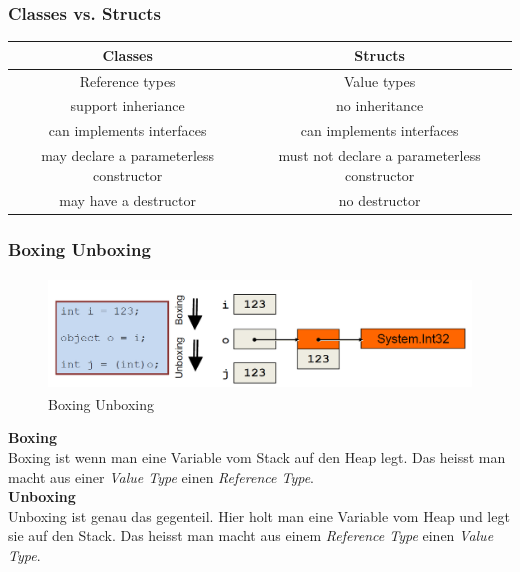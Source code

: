 \subsubsection{Classes vs. Structs}
\begin{tabular}{|c|c|}
	\hline
	           \textbf{Classes }            &               \textbf{Structs}               \\ \hline
	            Reference types             &                 Value types                  \\ \hline
	          support inheriance            &                no inheritance                \\ \hline
	       can implements interfaces        &          can implements interfaces           \\ \hline
	may declare a parameterless constructor & must not declare a parameterless constructor \\ \hline
	         may have a destructor          &                no destructor                 \\ \hline
\end{tabular} 

\subsubsection{Boxing Unboxing}
\begin{figure}[h]
	\centering
	\includegraphics[height=3cm, ]{images/CSharp/BoxingUnboxing}
	\caption{Boxing Unboxing}	
\end{figure}

\textbf{Boxing}\\
Boxing ist wenn man eine Variable vom Stack auf den Heap legt. Das heisst man macht aus einer \textit{Value Type} einen \textit{Reference Type}.\\ 

\textbf{Unboxing}\\
Unboxing ist genau das gegenteil. Hier holt man eine Variable vom Heap und legt sie auf den Stack. Das heisst man macht aus einem \textit{Reference Type} einen \textit{Value Type}.
